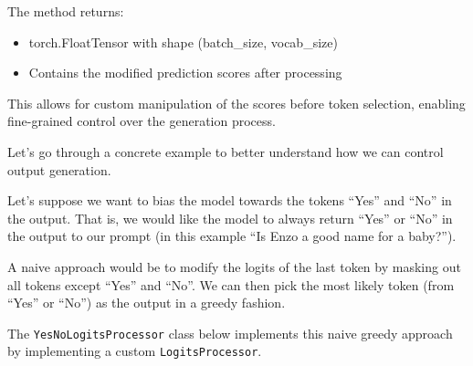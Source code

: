 The method returns:
\begin{itemize}
    \item torch.FloatTensor with shape (batch\_size, vocab\_size)
    \item Contains the modified prediction scores after processing
\end{itemize}

This allows for custom manipulation of the scores before token selection, enabling fine-grained control over the generation process.

Let's go through a concrete example to better understand how we can control output generation.

Let's suppose we want to bias the model towards the tokens ``Yes'' and ``No'' in the output. That is, we would like the model to always return ``Yes'' or ``No'' in the output to our prompt (in this example ``Is Enzo a good name for a baby?''). 

A naive approach would be to modify the logits of the last token by masking out all tokens except ``Yes'' and ``No''. We can then pick the most likely token (from ``Yes'' or ``No'') as the output in a greedy fashion.

The \texttt{YesNoLogitsProcessor} class below implements this naive greedy approach by implementing a custom \texttt{LogitsProcessor}.


